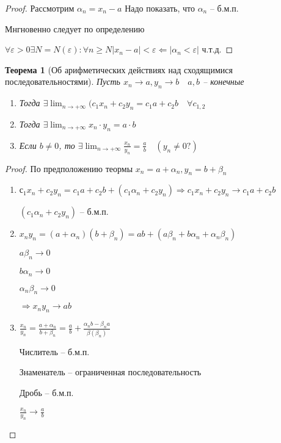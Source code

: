 \documentclass{book}
\newtheorem{Th}{Теорема}[chapter]
\begin{document}
\begin{proof}
	Рассмотрим $\alpha_n = x_n -a$ Надо показать, что $\alpha_n$ -- б.м.п.
	
	Мнгновенно следует по определению
	
	$\forall \varepsilon > 0 \exists N = N(\varepsilon): \forall n \geqslant N |x_n-a|<\varepsilon \Longleftarrow |\alpha_n<\varepsilon|$ ч.т.д.
\end{proof}

\begin{Th}[Об арифметических действиях над сходящимися последовательностями]
Пусть $x_n \to a, y_n \to b\quad a, b$ -- конечные

\begin{enumerate}
	\item Тогда $\exists \lim_{n\to + \infty}(c_1x_n + c_2y_n = c_1a+c_2b\quad \forall c_{1, 2}$
	\item Тогда $\exists \lim_{n\to + \infty} x_n \cdot y_n = a \cdot b$
	\item Если $b \neq 0$, то $\exists \lim_{n \to + \infty} \frac{x_n}{y_n} = \frac{a}{b} \quad (y_n \neq 0?)$
\end{enumerate}	

\end{Th}

\begin{proof}
	По предположению теормы $x_n = a + \alpha_n, y_n = b + \beta_n$
	\begin{enumerate}
		\item $с_1x_n + c_2y_n = c_1 a + c_2 b +(c_1\alpha_n+c_2y_n) \Rightarrow c_1x_n + c_2y_n \to c_1a+c_2b$
		
		$(c_1\alpha_n+c_2y_n)$ -- б.м.п.
		\item $x_ny_n=(a+\alpha_n)(b + \beta_n) = ab + (a\beta_n + b \alpha_n+\alpha_n\beta_n)$
		
		$a\beta_n \to 0$
		
		$b \alpha_n \to 0$
		
		$\alpha_n\beta_n \to 0$  
		
		$\Rightarrow x_ny_n \to ab$
		\item $\frac{x_n}{y_n} = \frac{a+\alpha_n}{b + \beta_n} = \frac{a}{b} + \frac{\alpha_nb-\beta_na}{\beta(\beta_n)}$
		
		Числитель -- б.м.п.

		Знаменатель -- ограниченная последовательность

		Дробь -- б.м.п.
		
		$\frac{x_n}{y_n} \to \frac{a}{b}$	
	\end{enumerate}
\end{proof}
	
\end{document}
